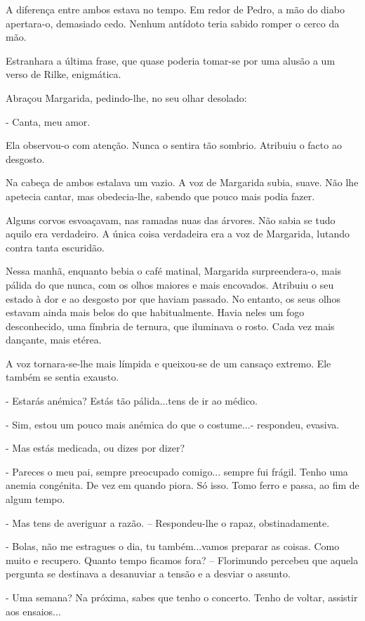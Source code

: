 A diferença entre ambos estava no tempo. Em redor de Pedro, a mão do
diabo apertara-o, demasiado cedo. Nenhum antídoto teria sabido romper o
cerco da mão.

Estranhara a última frase, que quase poderia tomar-se por uma alusão a
um verso de Rilke, enigmática.

Abraçou Margarida, pedindo-lhe, no seu olhar desolado:

- Canta, meu amor.

Ela observou-o com atenção. Nunca o sentira tão sombrio. Atribuiu o
facto ao desgosto.

Na cabeça de ambos estalava um vazio. A voz de Margarida subia, suave.
Não lhe apetecia cantar, mas obedecia-lhe, sabendo que pouco mais podia
fazer.

Alguns corvos esvoaçavam, nas ramadas nuas das árvores. Não sabia se
tudo aquilo era verdadeiro. A única coisa verdadeira era a voz de
Margarida, lutando contra tanta escuridão.

Nessa manhã, enquanto bebia o café matinal, Margarida surpreendera-o,
mais pálida do que nunca, com os olhos maiores e mais encovados.
Atribuiu o seu estado à dor e ao desgosto por que haviam passado. No
entanto, os seus olhos estavam ainda mais belos do que habitualmente.
Havia neles um fogo desconhecido, uma fímbria de ternura, que iluminava
o rosto. Cada vez mais dançante, mais etérea.

A voz tornara-se-lhe mais límpida e queixou-se de um cansaço extremo.
Ele também se sentia exausto.

- Estarás anémica? Estás tão pálida...tens de ir ao médico.

- Sim, estou um pouco mais anémica do que o costume...- respondeu,
evasiva.

- Mas estás medicada, ou dizes por dizer?

- Pareces o meu pai, sempre preocupado comigo... sempre fui frágil.
Tenho uma anemia congénita. De vez em quando piora. Só isso. Tomo ferro
e passa, ao fim de algum tempo.

- Mas tens de averiguar a razão. -- Respondeu-lhe o rapaz,
obstinadamente.

- Bolas, não me estragues o dia, tu também...vamos preparar as coisas.
Como muito e recupero. Quanto tempo ficamos fora? -- Florimundo percebeu
que aquela pergunta se destinava a desanuviar a tensão e a desviar o
assunto.

- Uma semana? Na próxima, sabes que tenho o concerto. Tenho de voltar,
assistir aos ensaios...

